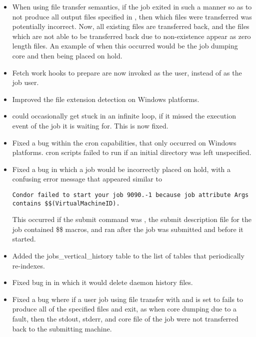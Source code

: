 \begin{itemize}

\item
When using file transfer semantics,
if the job exited in such a manner so as to not produce all
output files specified in ,
then which files were transferred was potentially incorrect.
Now, all existing files are transferred back,
and the files which are not able to be transferred back due to non-existence
appear as zero length files.
An example of when this occurred would be the job dumping core
and then being placed on hold.

\item
Fetch work hooks to prepare are now invoked as the  user,
instead of as the job user.

\item
Improved the file extension detection on Windows platforms.

\item
{} could occasionally get stuck in an infinite loop,
if it missed the execution event of the job it is waiting for.
This is now fixed.

\item
Fixed a bug within the  cron capabilities,
that only occurred on Windows platforms.
 cron scripts failed to run if an initial directory was left
unspecified.

\item
Fixed a bug in which a job would be incorrectly placed on hold, with 
a confusing error message that appeared similar to
\footnotesize
\begin{verbatim}
Condor failed to start your job 9090.-1 because job attribute Args contains $$(VirtualMachineID).
\end{verbatim}
\normalsize
This occurred if the submit command  
was ,
the submit description file for the job contained \$\$ macros,
and  ran after the job was submitted and before it started.

\item
Added the jobs\_vertical\_history table to the list of tables that
 periodically re-indexes.

\item
Fixed bug in  in which it would delete  daemon
history files.

\item
  Fixed a bug where if a user job using file transfer with
   and 
  is set to  fails
  to produce all of the specified files and exit, as when core
  dumping due to a fault, then the stdout, stderr, and core file of the
  job were not transferred back to the submitting machine.


\end{itemize}
